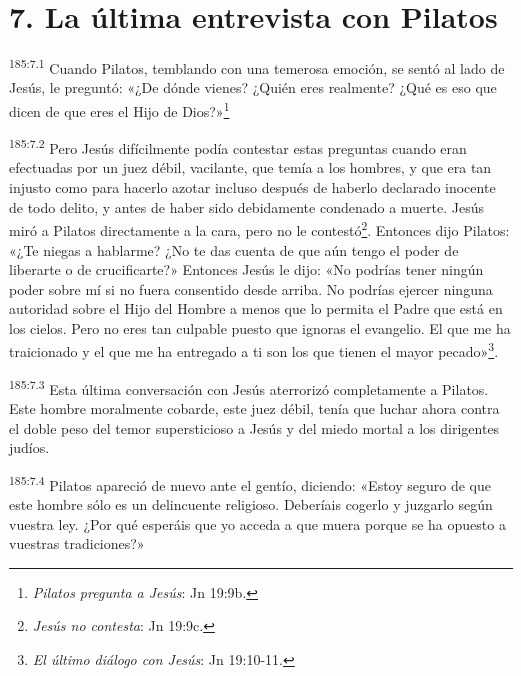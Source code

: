 \section*{7. La última entrevista con Pilatos}
\par
\textsuperscript{185:7.1} Cuando Pilatos, temblando con una temerosa emoción, se sentó al lado de Jesús, le preguntó: «¿De dónde vienes? ¿Quién eres realmente? ¿Qué es eso que dicen de que eres el Hijo de Dios?»\footnote{\textit{Pilatos pregunta a Jesús}: Jn 19:9b.}

\par
\textsuperscript{185:7.2} Pero Jesús difícilmente podía contestar estas preguntas cuando eran efectuadas por un juez débil, vacilante, que temía a los hombres, y que era tan injusto como para hacerlo azotar incluso después de haberlo declarado inocente de todo delito, y antes de haber sido debidamente condenado a muerte. Jesús miró a Pilatos directamente a la cara, pero no le contestó\footnote{\textit{Jesús no contesta}: Jn 19:9c.}. Entonces dijo Pilatos: «¿Te niegas a hablarme? ¿No te das cuenta de que aún tengo el poder de liberarte o de crucificarte?» Entonces Jesús le dijo: «No podrías tener ningún poder sobre mí si no fuera consentido desde arriba. No podrías ejercer ninguna autoridad sobre el Hijo del Hombre a menos que lo permita el Padre que está en los cielos. Pero no eres tan culpable puesto que ignoras el evangelio. El que me ha traicionado y el que me ha entregado a ti son los que tienen el mayor pecado»\footnote{\textit{El último diálogo con Jesús}: Jn 19:10-11.}.

\par
\textsuperscript{185:7.3} Esta última conversación con Jesús aterrorizó completamente a Pilatos. Este hombre moralmente cobarde, este juez débil, tenía que luchar ahora contra el doble peso del temor supersticioso a Jesús y del miedo mortal a los dirigentes judíos.

\par
\textsuperscript{185:7.4} Pilatos apareció de nuevo ante el gentío, diciendo: «Estoy seguro de que este hombre sólo es un delincuente religioso. Deberíais cogerlo y juzgarlo según vuestra ley. ¿Por qué esperáis que yo acceda a que muera porque se ha opuesto a vuestras tradiciones?»

